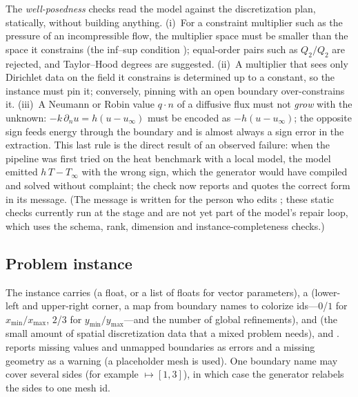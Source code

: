 The \emph{well-posedness} checks read the model against the discretization plan, statically, without building anything. (i)~For a constraint multiplier such as the pressure of an incompressible flow, the multiplier space must be smaller than the space it constrains (the inf--sup condition \citep{boffi2013}); equal-order pairs such as $Q_2/Q_2$ are rejected, and Taylor--Hood degrees \citep{taylorhood1973} are suggested. (ii)~A multiplier that sees only Dirichlet data on the field it constrains is determined up to a constant, so the instance must pin it; conversely, pinning with an open boundary over-constrains it. (iii)~A Neumann or Robin value $q\cdot n$ of a diffusive flux must not \emph{grow} with the unknown: $-k\,\partial_n u = h(u-u_\infty)$ must be encoded as $-h(u-u_\infty)$; the opposite sign feeds energy through the boundary and is almost always a sign error in the extraction. This last rule is the direct result of an observed failure: when the pipeline was first tried on the heat benchmark with a local model, the model emitted $h\,T - T_\infty$ with the wrong sign, which the generator would have compiled and solved without complaint; the check now reports  and quotes the correct form in its message. (The message is written for the person who edits ; these static checks currently run at the  stage and are not yet part of the model's repair loop, which uses the schema, rank, dimension and instance-completeness checks.)

\subsection{Problem instance}
The instance carries  (a float, or a list of floats for vector parameters), a  (lower-left and upper-right corner, a map from boundary names to \dealii{} colorize ids---$0$/$1$ for $x_{\min}/x_{\max}$, $2$/$3$ for $y_{\min}/y_{\max}$---and the number of global refinements),  and  (the small amount of spatial discretization data that a mixed problem needs), and .  reports missing values and unmapped boundaries as errors and a missing geometry as a warning (a placeholder mesh is used). One boundary name may cover several sides (for example $\mapsto[1,3]$), in which case the generator relabels the sides to one mesh id.

